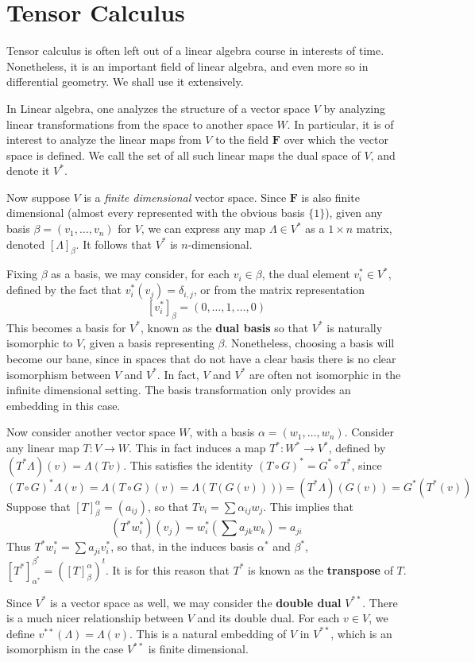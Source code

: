 \chapter{Tensor Calculus}

Tensor calculus is often left out of a linear algebra course in interests of time. Nonetheless, it is an important field of linear algebra, and even more so in differential geometry. We shall use it extensively.

In Linear algebra, one analyzes the structure of a vector space $V$ by analyzing linear transformations from the space to another space $W$. In particular, it is of interest to analyze the linear maps from $V$ to the field $\mathbf{F}$ over which the vector space is defined. We call the set of all such linear maps the dual space of $V$, and denote it $V^*$.

Now suppose $V$ is a {\it finite dimensional} vector space. Since $\mathbf{F}$ is also finite dimensional (almost every represented with the obvious basis $\{ 1 \}$), given any basis $\beta = (v_1, \dots, v_n)$ for $V$, we can express any map $\Lambda \in V^*$ as a $1 \times n$ matrix, denoted $[\Lambda]_{\beta}$. It follows that $V^*$ is $n$-dimensional.

Fixing $\beta$ as a basis, we may consider, for each $v_i \in \beta$, the dual element $v_i^* \in V^*$, defined by the fact that $v_i^*(v_j) = \delta_{i,j}$, or from the matrix representation
%
\[ [v_i^*]_\beta = (0, \dots, 1, \dots, 0) \]
%
This becomes a basis for $V^*$, known as the {\bf dual basis} so that $V^*$ is naturally isomorphic to $V$, given a basis representing $\beta$. Nonetheless, choosing a basis will become our bane, since in spaces that do not have a clear basis there is no clear isomorphism between $V$ and $V^*$. In fact, $V$ and $V^*$ are often not isomorphic in the infinite dimensional setting. The basis transformation only provides an embedding in this case.

Now consider another vector space $W$, with a basis $\alpha = (w_1, \dots, w_n)$. Consider any linear map $T:V \to W$. This in fact induces a map $T^*:W^* \to V^*$, defined by $(T^*\Lambda)(v) = \Lambda(Tv)$. This satisfies the identity $(T \circ G)^* = G^* \circ T^*$, since
%
\[ (T \circ G)^*\Lambda(v) = \Lambda(T \circ G)(v) = \Lambda(T(G(v)))) = (T^*\Lambda)(G(v)) = G^*(T^*(v)) \]
%
Suppose that $[T]_\beta^\alpha = (a_{ij})$, so that $Tv_i = \sum \alpha_{ij} w_j$. This implies that
%
\[ (T^*w_i^*)(v_j) = w_i^*(\sum a_{jk} w_k) = a_{ji} \]
%
Thus $T^*w_i^* = \sum a_{ji} v_i^*$, so that, in the induces basis $\alpha^*$ and $\beta^*$, $[T^*]_{\alpha^*}^{\beta^*} = ([T]_\beta^\alpha)^t$. It is for this reason that $T^*$ is known as the {\bf transpose} of $T$.

Since $V^*$ is a vector space as well, we may consider the {\bf double dual} $V^{**}$. There is a much nicer relationship between $V$ and its double dual. For each $v \in V$, we define $v^{**}(\Lambda) = \Lambda(v)$. This is a natural embedding of $V$ in $V^{**}$, which is an isomorphism in the case $V^{**}$ is finite dimensional.